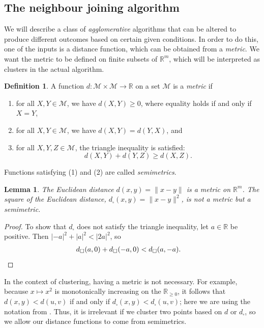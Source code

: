 \documentclass[a4paper, 12pt]{article}
\numberwithin{equation}{section}
\numberwithin{figure}{section}
\newtheorem{lem}[thm]{Lemma}
\theoremstyle{definition}
\newtheorem{defn}[thm]{Definition}
\renewcommand{\geq}{\geqslant}
\newcommand{\R}{\mathbb{R}}
\begin{document}
\subsection{The neighbour joining algorithm}

We will describe a class of \emph{agglomerative} algorithms that can be altered
to produce different outcomes based on certain given conditions. In order to do
this, one of the inputs is a distance function, which can be obtained from a
\emph{metric}. We want the metric to be defined on finite subsets of $\R^m$,
which will be interpreted as clusters in the actual algorithm. 

\begin{defn}
	A function $d: \mathscr{M}\times \mathscr{M} \to \R$ on a set $\mathscr{M}$
	is a \emph{metric} if 
	\begin{enumerate}
		\item for all $X, Y\in \mathscr{M}$, we have $d(X, Y) \geq 0$, where
		equality holds if and only if $X=Y$,
		\item for all $X, Y\in\mathscr{M}$, we have $d(X, Y) = d(Y, X)$, and
		\item for all $X, Y, Z\in\mathscr{M}$, the triangle inequality is
		satisfied:
		\[ 
			d(X, Y) + d(Y, Z) \geq d(X, Z). 
		\] 
	\end{enumerate}
	Functions satisfying (1) and (2) are called \emph{semimetrics}. 
\end{defn}

\begin{lem}\label{lem:semimetrics}
	The Euclidean distance $d(x,y) = \|x-y\|$ is a metric on $\R^m$. The square
	of the Euclidean distance, $d_{\square}(x,y)=\|x-y\|^2$, is not a metric but
	a semimetric.
\end{lem}

\begin{proof}
	To show that $d_{\square}$ does not satisfy the triangle inequality, let
	$a\in\R$ be positive. Then $|-a|^2 + |a|^2 < |2a|^2$, so
	\begin{align*}
		d_{\square}(a,0) + d_{\square}(-a,0) &< d_{\square}(a,-a). \qedhere
	\end{align*}
\end{proof}

In the context of clustering, having a metric is not necessary. For example,
because $x\mapsto x^2$ is monotonically increasing on the $\R_{\geq 0}$, it
follows that $d(x,y) < d(u,v)$ if and only if $d_{\square}(x,y) <
d_{\square}(u,v)$; here we are using the notation from .
Thus, it is irrelevant if we cluster two points based on $d$ or $d_{\square}$,
so we allow our distance functions to come from semimetrics. 
\end{document}
